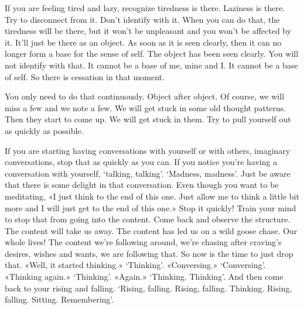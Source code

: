 \documentclass[letterpaper,10pt,english]{sphinxmanual}
\begin{document}
\sphinxAtStartPar
If you are feeling tired and lazy, recognize tiredness is there. Laziness
is there. Try to disconnect from it. Don’t identify with it. When you can do
that, the tiredness will be there, but it won’t be unpleasant and you won’t be
  affected by it. It’ll just be there as an object. As soon as it is seen clearly, then
it can no longer form a base for the sense of self. The object has been seen
clearly. You will not identify with that. It cannot be a base of me, mine and I.
It cannot be a base of self. So there is cessation in that moment.

\sphinxAtStartPar
You only need to do that continuously. Object after object. Of course,
we will miss a few and we note a few. We will get stuck in some old thought
patterns. Then they start to come up. We will get stuck in them. Try to pull
yourself out as quickly as possible.

\sphinxAtStartPar
If you are starting having conversations with yourself or with others,
imaginary conversations, stop that as quickly as you can. If you notice you’re
having a conversation with yourself, ‘talking, talking’. ‘Madness, madness’.
Just be aware that there is some delight in that conversation. Even though
you want to be meditating, «I just think to the end of this one. Just allow
me to think a little bit more and I will just get to the end of this one.» Stop
it quickly! Train your mind to stop that from going into the content. Come
back and observe the structure. The content will take us away. The content
has led us on a wild goose chase. Our whole lives! The content we’re following around, we’re chasing after craving’s desires, wishes and wants, we are
following that. So now is the time to just drop that. «Well, it started thinking.»  ‘Thinking’.  «Conversing.»  ‘Conversing’.  «Thinking  again.»  ‘Thinking’. «Again.» ‘Thinking. Thinking’. And then come back to your rising and
falling.  ‘Rising,  falling.  Rising,  falling.  Thinking.  Rising,  falling.  Sitting.
Remembering’.
\end{document}
